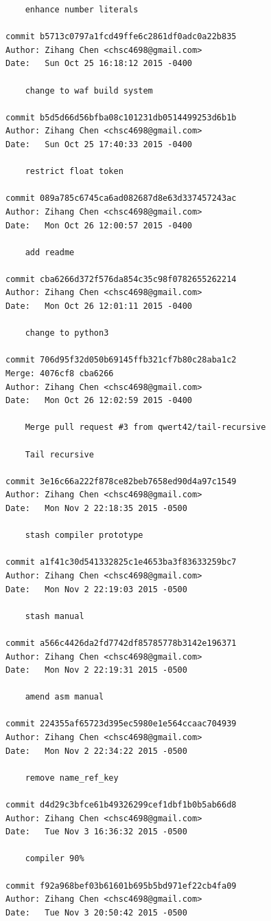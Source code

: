 \documentclass{report}
\begin{document}
\begin{appendices}
\begin{verbatim}
    enhance number literals

commit b5713c0797a1fcd49ffe6c2861df0adc0a22b835
Author: Zihang Chen <chsc4698@gmail.com>
Date:   Sun Oct 25 16:18:12 2015 -0400

    change to waf build system

commit b5d5d66d56bfba08c101231db0514499253d6b1b
Author: Zihang Chen <chsc4698@gmail.com>
Date:   Sun Oct 25 17:40:33 2015 -0400

    restrict float token

commit 089a785c6745ca6ad082687d8e63d337457243ac
Author: Zihang Chen <chsc4698@gmail.com>
Date:   Mon Oct 26 12:00:57 2015 -0400

    add readme

commit cba6266d372f576da854c35c98f0782655262214
Author: Zihang Chen <chsc4698@gmail.com>
Date:   Mon Oct 26 12:01:11 2015 -0400

    change to python3

commit 706d95f32d050b69145ffb321cf7b80c28aba1c2
Merge: 4076cf8 cba6266
Author: Zihang Chen <chsc4698@gmail.com>
Date:   Mon Oct 26 12:02:59 2015 -0400

    Merge pull request #3 from qwert42/tail-recursive
    
    Tail recursive

commit 3e16c66a222f878ce82beb7658ed90d4a97c1549
Author: Zihang Chen <chsc4698@gmail.com>
Date:   Mon Nov 2 22:18:35 2015 -0500

    stash compiler prototype

commit a1f41c30d541332825c1e4653ba3f83633259bc7
Author: Zihang Chen <chsc4698@gmail.com>
Date:   Mon Nov 2 22:19:03 2015 -0500

    stash manual

commit a566c4426da2fd7742df85785778b3142e196371
Author: Zihang Chen <chsc4698@gmail.com>
Date:   Mon Nov 2 22:19:31 2015 -0500

    amend asm manual

commit 224355af65723d395ec5980e1e564ccaac704939
Author: Zihang Chen <chsc4698@gmail.com>
Date:   Mon Nov 2 22:34:22 2015 -0500

    remove name_ref_key

commit d4d29c3bfce61b49326299cef1dbf1b0b5ab66d8
Author: Zihang Chen <chsc4698@gmail.com>
Date:   Tue Nov 3 16:36:32 2015 -0500

    compiler 90%

commit f92a968bef03b61601b695b5bd971ef22cb4fa09
Author: Zihang Chen <chsc4698@gmail.com>
Date:   Tue Nov 3 20:50:42 2015 -0500


\end{verbatim}
\end{appendices}
\end{document}
